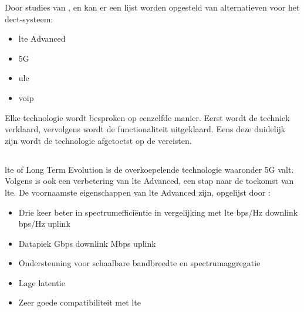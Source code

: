 Door studies van \textcite{Montalvo2024}, \textcite{Kranz2010} en \textcite{Soenmez2018} kan er een lijst worden opgesteld van alternatieven voor het \gls{dect}-systeem:

\begin{itemize}
  \item \gls{lte} Advanced
  \item 5G
  \item \gls{ule}
  \item \gls{voip}
\end{itemize}

Elke technologie wordt besproken op eenzelfde manier. Eerst wordt de techniek verklaard, vervolgens wordt de functionaliteit uitgeklaard. Eens deze duidelijk zijn wordt de technologie afgetoetst op de vereisten.

\subsection{}%
\label{sec:ltea}%

\gls{lte} of Long Term Evolution is de overkoepelende technologie waaronder 5G valt. Volgens \textcite{Bakare2022} is ook een verbetering van \gls{lte} Advanced, een stap naar de toekomst van \gls{lte}. De voornaamste eigenschappen van \gls{lte} Advanced zijn, opgelijst door \textcite{Bakare2022}:

\begin{itemize}
  \item Drie keer beter in spectrumefficiëntie in vergelijking met \gls{lte}
   bps/Hz downlink
   bps/Hz uplink
  \item Datapiek 
   Gbps downlink
   Mbps uplink
  \item Ondersteuning voor schaalbare bandbreedte en spectrumaggregatie
  \item Lage latentie
  \item Zeer goede compatibiliteit met \gls{lte}
\end{itemize}

